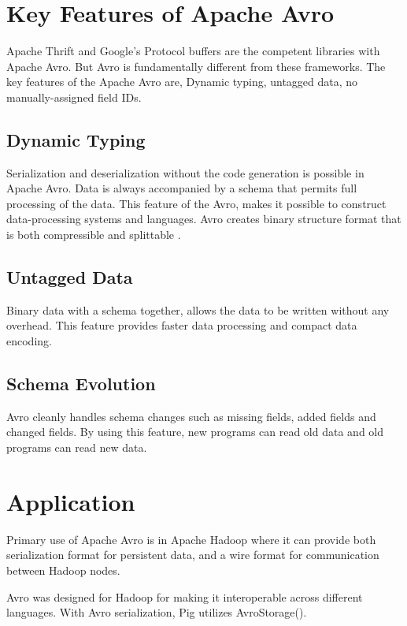 \documentclass[9pt,twocolumn,twoside]{../../styles/osajnl}
\begin{document}
\section{Key Features of Apache Avro}

Apache Thrift and Google’s Protocol buffers are the competent
libraries with Apache Avro. But Avro is fundamentally different from
these frameworks. The key features of the Apache Avro are, Dynamic
typing, untagged data, no manually-assigned field IDs.

\subsection{Dynamic Typing}

Serialization and deserialization without the code generation is
possible in Apache Avro. Data is always accompanied by a schema that
permits full processing of the data. This feature of the Avro, makes
it possible to construct data-processing systems and languages. Avro
creates binary structure format that is both compressible and
splittable \cite{www-tutorialspoint-avro}.

\subsection{Untagged Data}

Binary data with a schema together, allows the data to be written
without any overhead. This feature provides faster data processing and
compact data encoding.

\subsection{Schema Evolution}

Avro cleanly handles schema changes such as missing fields, added
fields and changed fields. By using this feature, new programs can
read old data and old programs can read new data.

\section{Application}

Primary use of Apache Avro is in Apache Hadoop where it can provide
both serialization format for persistent data, and a wire format for
communication between Hadoop nodes.

Avro was designed for Hadoop for making it interoperable across
different languages.  With Avro serialization, Pig utilizes
AvroStorage().
\end{document}
